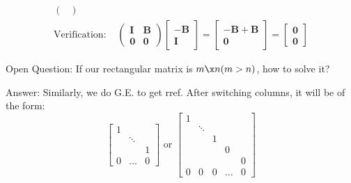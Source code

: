 \begin{itemize}
\[\begin{aligned}
\begin{pmatrix}
\end{pmatrix}
\\
\mbox{Verification: }&
\begin{pmatrix}
\bm I&\bm B\\\bm 0&\bm 0
\end{pmatrix}\begin{bmatrix}
-\bm B\\\bm I
\end{bmatrix} = \begin{bmatrix}
-\bm B+\bm B\\\bm 0
\end{bmatrix} = \begin{bmatrix}
\bm 0\\\bm 0
\end{bmatrix}
\end{aligned}
\]
\end{itemize}
Open Question: 
If our rectangular matrix is $m\x n(m>n)$, how to solve it?

Answer: Similarly, we do G.E. to get rref. After switching columns, it will be of the form:
\[
\begin{bmatrix}
1&&\\&\ddots&\\&&1\\0&\dots&0
\end{bmatrix}\text{ or }\begin{bmatrix}
1& & & & \\
 &\ddots&&&\\
 & & 1&&\\
 &&&0&\\
 &&&&0\\0&0&0&\dots&0
\end{bmatrix}
\]
